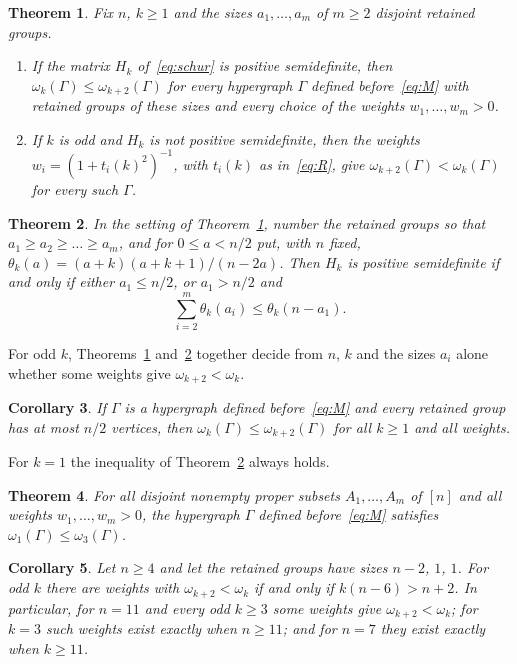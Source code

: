 \documentclass[11pt]{amsart}
\newtheorem{thm}{Theorem}[section]
\newtheorem{cor}[thm]{Corollary}
\theoremstyle{remark}
\numberwithin{equation}{section}
\begin{document}
\begin{thm}\label{thm:criterion}
Fix $n$, $k\ge1$ and the sizes $a_1,\dots,a_m$ of $m\ge2$ disjoint retained groups.
\begin{enumerate}
\item If the matrix $H_k$ of~\eqref{eq:schur} is positive semidefinite, then $\omega_k(\Gamma)\le\omega_{k+2}(\Gamma)$ for every hypergraph $\Gamma$ defined before~\eqref{eq:M} with retained groups of these sizes and every choice of the weights $w_1,\dots,w_m>0$.
\item If $k$ is odd and $H_k$ is not positive semidefinite, then the weights $w_i=(1+t_i(k)^2)^{-1}$, with $t_i(k)$ as in~\eqref{eq:R}, give $\omega_{k+2}(\Gamma)<\omega_k(\Gamma)$ for every such $\Gamma$.
\end{enumerate}
\end{thm}

\begin{thm}\label{thm:psd}
In the setting of Theorem~\ref{thm:criterion}, number the retained groups so that $a_1\ge a_2\ge\dots\ge a_m$, and for $0\le a<n/2$ put, with $n$ fixed, $\theta_k(a)=(a+k)(a+k+1)/(n-2a)$. Then $H_k$ is positive semidefinite if and only if either $a_1\le n/2$, or $a_1>n/2$ and
\[
\sum_{i=2}^m\theta_k(a_i)\le\theta_k(n-a_1).
\]
\end{thm}

For odd $k$, Theorems~\ref{thm:criterion} and~\ref{thm:psd} together decide from $n$, $k$ and the sizes $a_i$ alone whether some weights give $\omega_{k+2}<\omega_k$.

\begin{cor}\label{cor:half}
If $\Gamma$ is a hypergraph defined before~\eqref{eq:M} and every retained group has at most $n/2$ vertices, then $\omega_k(\Gamma)\le\omega_{k+2}(\Gamma)$ for all $k\ge1$ and all weights.
\end{cor}

For $k=1$ the inequality of Theorem~\ref{thm:psd} always holds.

\begin{thm}\label{thm:first}
For all disjoint nonempty proper subsets $A_1,\dots,A_m$ of $[n]$ and all weights $w_1,\dots,w_m>0$, the hypergraph $\Gamma$ defined before~\eqref{eq:M} satisfies $\omega_1(\Gamma)\le\omega_3(\Gamma)$.
\end{thm}

\begin{cor}\label{cor:family}
Let $n\ge4$ and let the retained groups have sizes $n-2$, $1$, $1$. For odd $k$ there are weights with $\omega_{k+2}<\omega_k$ if and only if $k(n-6)>n+2$. In particular, for $n=11$ and every odd $k\ge3$ some weights give $\omega_{k+2}<\omega_k$; for $k=3$ such weights exist exactly when $n\ge11$; and for $n=7$ they exist exactly when $k\ge11$.
\end{cor}
\end{document}

